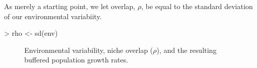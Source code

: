 As merely a starting point, we let overlap, $\rho$, be equal to the standard deviation of our environmental variabiity.
\begin{Schunk}
\begin{Sinput}
> rho <- sd(env)
\end{Sinput}
\end{Schunk}

\begin{figure}[ht]
  \centering
  \caption{Environmental variability, niche overlap ($\rho$), and the resulting buffered population growth rates.}
  \label{fig:rho}
\end{figure}

